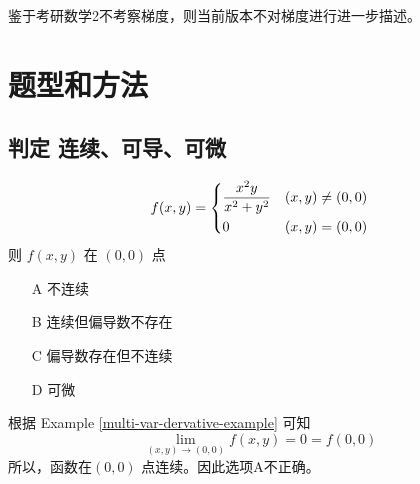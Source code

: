 鉴于考研数学2不考察梯度，则当前版本不对梯度进行进一步描述。

\section{题型和方法}

\subsection{判定 连续、可导、可微}

\begin{example}
    \label{general-example-relation-continuous-differential}
    \[
        f(x, y) = 
        \begin{dcases}
            \dfrac{x^2 y}{x^2 + y^2}    & (x, y) \neq (0, 0) \\
            0                           & (x, y) = (0,0)
        \end{dcases}
    \]
    则 $f(x, y)$ 在 $(0,0)$ 点
    \begin{itemize}
        \item[A] 不连续
        \item[B] 连续但偏导数不存在
        \item[C] 偏导数存在但不连续
        \item[D] 可微
    \end{itemize}

    \cite[page 156]{we}
    
    根据 Example \ref{multi-var-dervative-example} 可知
    \[
        \lim_{(x, y) \to (0,0)} f(x, y) = 0 = f(0, 0)
    \]
    所以，函数在$(0,0)$ 点连续。因此选项A不正确。


\end{example}
